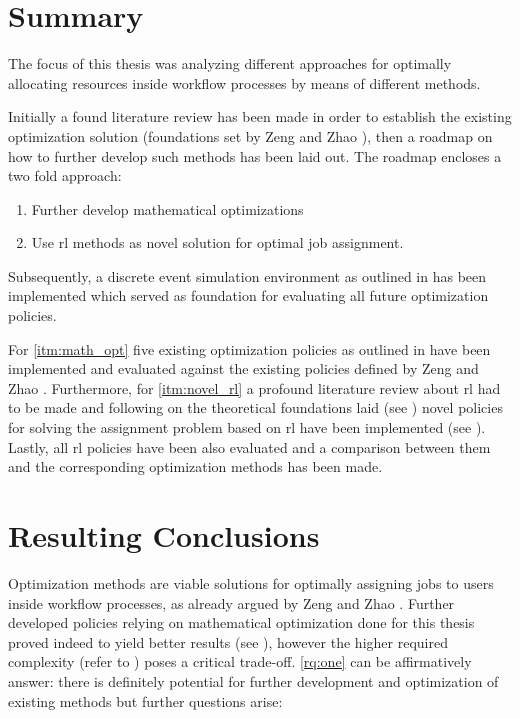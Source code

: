 \documentclass{seal_thesis}
\begin{document}
\section{Summary}

The focus of this thesis was analyzing different approaches for optimally allocating resources inside workflow processes by means of different methods.

Initially a found literature review has been made in order to establish the existing optimization solution (\ie foundations set by Zeng and Zhao \cite{Zeng2005}), then a roadmap on how to further develop such methods has been laid out. The roadmap encloses a two fold approach:

\begin{enumerate}[label=\textbf{Appr. \arabic*},ref=Approach \arabic*]
 	\item Further develop mathematical optimizations \label{itm:math_opt}
 	\item Use \gls{rl} methods as novel solution for optimal job assignment. \label{itm:novel_rl}
 \end{enumerate} 

Subsequently, a discrete event simulation environment as outlined in  has been implemented which served as foundation for evaluating all future optimization policies.

For \ref{itm:math_opt} five existing optimization policies as outlined in  have been implemented and evaluated against the existing policies defined by Zeng and Zhao \cite[pp. 13-14]{Zeng2005}. Furthermore, for \ref{itm:novel_rl} a profound literature review about \gls{rl} had to be made and following on the theoretical foundations laid (see ) novel policies for solving the assignment problem based on \gls{rl} have been implemented (see ). Lastly, all \gls{rl} policies have been also evaluated and a comparison between them and the corresponding optimization methods has been made.

\section{Resulting Conclusions}

Optimization methods are viable solutions for optimally assigning jobs to users inside workflow processes, as already argued by Zeng and Zhao \cite{Zeng2005}. Further developed policies relying on mathematical optimization done for this thesis proved indeed to yield better results (see ), however the higher required complexity (refer to ) poses a critical trade-off. \ref{rq:one} can be affirmatively answer: there is definitely potential for further development and optimization of existing methods but further questions arise:
\end{document}
